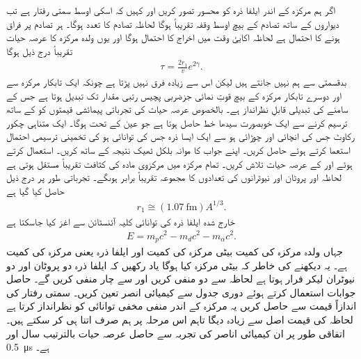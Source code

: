 اگر ہم مرکزہ کے اندر ایلفا ذرہ کو محسور تصور کریں اور کہیں کہ اسکی اوسط سمتی رفتار  ہے تب دیواروں کے ساتھ تصادم کے بیچ اوسط وقفہ تقریباً  ہوگا لحاظہ تصادم کا تعدد  ہوگا۔ ہر تصادم پر فراق ہونے کا احتمال  ہے لحاظہ اکایئ وقت میں اخراج کا احتمال  ہوگا اور یوں ولدہ مرکزہ کا عرصہ حیات تقریباً درج ذیل ہوگا
\begin{align}
	\tau=\frac{2r_{1}}{v} e^{2\gamma}.
\end{align}
بدقسمتی سے ہم  نہیں جانتے ہیں لیکن اس سے زیادہ فرق نہیں پڑتا ہے چونکہ ایک تابکار مرکزہ سے اور دوسرے تابکار مرکزہ کے بیچ قوتِ نمائی جزضربی پچیس رتبی مقدار تک تبدیل ہوتا ہے جس کے سامنے  کی تبدیلی قابلِ نظرانداز ہے۔ بالخصوص عرصہ حیات کی تجرباتی پیمائشی قیمتوں کو  کے ساتھ ترسیم کرنے سے ایک خوبصورت سیدھا خط  حاصل ہوتا ہے جو عین  کے تحت ہوگا۔
ایک متناہی چکور رکاوٹ جس کی انچائی  اور چوڑائی  ہو سے ایک ایسا ذرہ جس کی توانائی  ہو کی تخمینی ترسیمی احتمال  استعما کرتے ہوئے حاصل کریں۔ اپنے جواب کا موانہ بلکل ٹھیک نتیجہ  کے ساتھ کریں۔
 استعمال کرتے ہوئے  اور  کے عرصہ حیات تلاش کریں۔ تمام مرکزہ میں مرکزوی مادہ کی کثافت تقریباً مستقل ہوتی ہے لحاظہ  اور  پروٹان اور نیوٹرانوں کی تعدادوں کا مجموعہ تقریباً برابر ہوںگے۔ تجرباتی طور پر درج ذیل حاصل کیا گیا ہے
\begin{align}
	r_{1}\cong(\SI{1.07}{\femto\meter})A^{1/3}.
\end{align}
خارج شدہ ایلفا ذرہ کی توانائی کلیہ آئنسٹائن  سے اغز کیا جاسکتا ہے
\begin{align}
	E=m_{p}c^{2}-m_{d}c^{2}-m_{\alpha}c^{2}.
\end{align}
جہاں  ولدہ مرکزہ کی کمیت  بیٹی مرکزہ کی کمیت اور  ایلفا ذرہ یعنی  مرکزہ کی کمیت ہے۔ یہ دیکھنے کی خاطر کہ بیٹی مرکزہ کیا ہوگا یاد رکھیں کہ ایلفا ذرہ دو پروٹان اور دو نیوٹران لیکر فرار ہوتا ہے لحاظہ  سے دو منفی کریں اور  سے چار منفی کریں گے۔ حاصل جوابات استعمال کرتے ہوئے دوری جدول سے کیمیائی انصر تعین کریں۔ سمتی رفتار  کی اندازاً قیمت  سے حاصل کریں یہ مرکزہ کے اندر منفی مخفی توانائی کو نظرانداز کرتا ہے لحاظہ  کی قیمت اصل سے زیادہ دیگا تاہم اس مرحلہ پر ہم صرف اتنا ہی کر سکتے ہیں۔ اتفاقی طور پر ان کیمیائی اناصر کی تجربہ سے حاصل عرصہ حیات بالترتیب  سال اور \SI{0.5}     {\micro\second} ہے۔



